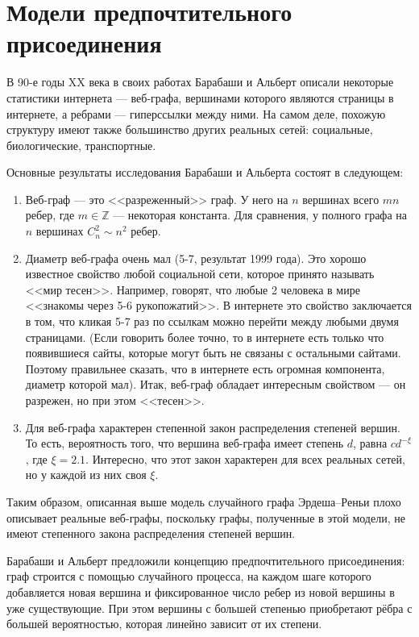 \documentclass[14pt]{extreport}
\begin{document}
\section{Модели предпочтительного присоединения}

В 90-е годы XX века в своих работах Барабаши и Альберт описали некоторые статистики интернета --- веб-графа, вершинами которого являются страницы в интернете, а ребрами --- гиперссылки между ними. На самом деле, похожую структуру имеют также большинство других реальных сетей: социальные, биологические, транспортные.

Основные результаты исследования Барабаши и Альберта состоят в следующем:
\begin{enumerate}

\item Веб-граф --- это <<разреженный>> граф. У него на $n$ вершинах всего $mn$ ребер, где $m \in \mathbb{Z}$ --- некоторая константа. Для сравнения, у полного графа на $n$ вершинах $C_n^2 \sim n^2$ ребер. 

\item Диаметр веб-графа очень мал (5-7, результат 1999 года). Это хорошо известное свойство любой социальной сети, которое принято называть <<мир тесен>>. Например, говорят, что любые 2 человека в мире <<знакомы через 5-6 рукопожатий>>. В интернете это свойство заключается в том, что кликая 5-7 раз по ссылкам можно перейти между любыми двумя страницами. (Если говорить более точно, то в интернете есть только что появившиеся сайты, которые могут быть не связаны с остальными сайтами. Поэтому правильнее сказать, что в интернете есть огромная компонента, диаметр которой мал). Итак, веб-граф обладает интересным свойством --- он разрежен, но при этом <<тесен>>.

\item Для веб-графа характерен степенной закон распределения степеней вершин. То есть, вероятность того, что вершина веб-графа имеет степень $d$, равна $c d^{-\xi}$, где $\xi = 2.1$. Интересно, что этот закон характерен для всех реальных сетей, но у каждой из них своя $\xi$.
\end{enumerate}

Таким образом, описанная выше модель случайного графа Эрдеша--Реньи плохо описывает реальные веб-графы, поскольку графы, полученные в этой модели, не имеют степенного закона распределения степеней вершин.

Барабаши и Альберт предложили концепцию предпочтительного присоединения: граф строится с помощью случайного процесса, на каждом шаге которого добавляется новая вершина и фиксированное число ребер из новой вершины в уже существующие. При этом вершины с большей степенью приобретают рёбра с большей вероятностью, которая линейно зависит от их степени.
\end{document}
